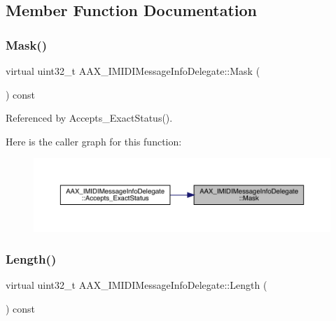 \subsection{Member Function Documentation}
\mbox{\label{a01953_ad04902fa8b4e437f200a314721eeaea4}} 
\subsubsection{\texorpdfstring{Mask()}{Mask()}}
{\footnotesize\ttfamily virtual uint32\+\_\+t A\+A\+X\+\_\+\+I\+M\+I\+D\+I\+Message\+Info\+Delegate\+::\+Mask (\begin{DoxyParamCaption}{ }\end{DoxyParamCaption}) const\hspace{0.3cm}{\ttfamily [pure virtual]}}



Referenced by Accepts\+\_\+\+Exact\+Status().

Here is the caller graph for this function\+:
\nopagebreak
\begin{figure}[H]
\begin{center}
\leavevmode
\includegraphics[width=350pt]{a01953_ad04902fa8b4e437f200a314721eeaea4_icgraph}
\end{center}
\end{figure}
\mbox{\label{a01953_a7e4bb6faf47d70dbefcdde952dd76e1c}} 
\subsubsection{\texorpdfstring{Length()}{Length()}}
{\footnotesize\ttfamily virtual uint32\+\_\+t A\+A\+X\+\_\+\+I\+M\+I\+D\+I\+Message\+Info\+Delegate\+::\+Length (\begin{DoxyParamCaption}{ }\end{DoxyParamCaption}) const\hspace{0.3cm}{\ttfamily [pure virtual]}}



